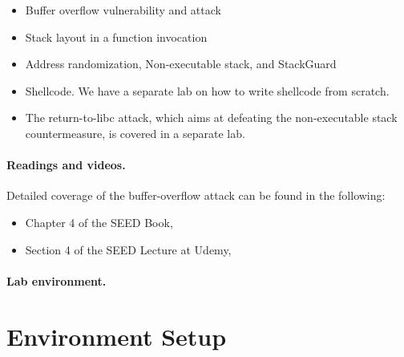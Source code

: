 \begin{itemize}[noitemsep]
\item Buffer overflow vulnerability and attack
\item Stack layout in a function invocation
\item Address randomization, Non-executable stack, and  StackGuard
\item Shellcode. We have a separate lab on how to write shellcode 
from scratch.
\item The return-to-libc attack, which aims at 
defeating the non-executable stack countermeasure, is covered 
in a separate lab.
\end{itemize}


\noindent
{}



\paragraph{Readings and videos.}
Detailed coverage of the buffer-overflow attack can be found in the following:

\begin{itemize}
\item Chapter 4 of the SEED Book, \seedbook
\item Section 4 of the SEED Lecture at Udemy, \seedcsvideo
\end{itemize}


\paragraph{Lab environment.} \seedenvironmentB



\newpage
\section{Environment Setup}


